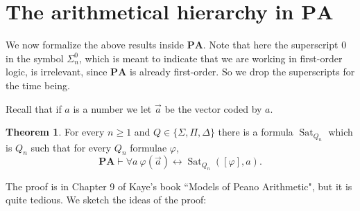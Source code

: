 \documentclass[12pt]{report}
\renewcommand{\iff}{\leftrightarrow}
\newcommand{\PA}{\mathbf{PA}}
\newcommand{\proves}{\vdash}
\DeclareMathOperator{\Sat}{Sat}
\theoremstyle{definition}
\newtheorem{theorem}{Theorem}[chapter]
\begin{document}
\section{The arithmetical hierarchy in $\PA$}
We now formalize the above results inside $\PA$. Note that here the superscript $0$ in the symbol $\Sigma_n^0$, which is meant to indicate that we are working in first-order logic, is irrelevant, since $\PA$ is already first-order. So we drop the superscripts for the time being.

Recall that if $a$ is a number we let $\vec a$ be the vector coded by $a$.
\begin{theorem}
For every $n \geq 1$ and $Q \in \{\Sigma, \Pi, \Delta\}$ there is a formula $\Sat_{Q_n}$ which is $Q_n$ such that for every $Q_n$ formulae $\varphi$,
$$\PA \proves \forall a~\varphi(\vec a) \iff \Sat_{Q_n}([\varphi], a).$$
\end{theorem}
The proof is in Chapter 9 of Kaye's book ``Models of Peano Arithmetic", but it is quite tedious. We sketch the ideas of the proof:
\end{document}
